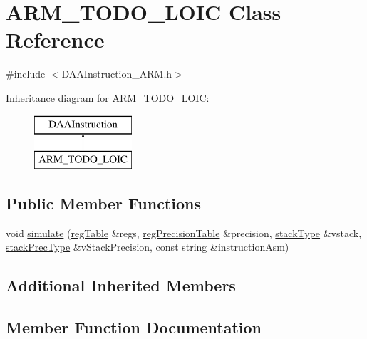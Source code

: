 \hypertarget{classARM__TODO__LOIC}{}\section{A\+R\+M\+\_\+\+T\+O\+D\+O\+\_\+\+L\+O\+IC Class Reference}
\label{classARM__TODO__LOIC}


{\ttfamily \#include $<$D\+A\+A\+Instruction\+\_\+\+A\+R\+M.\+h$>$}

Inheritance diagram for A\+R\+M\+\_\+\+T\+O\+D\+O\+\_\+\+L\+O\+IC\+:\begin{figure}[H]
\begin{center}
\leavevmode
\includegraphics[height=2.000000cm]{classARM__TODO__LOIC}
\end{center}
\end{figure}
\subsection*{Public Member Functions}
\begin{DoxyCompactItemize}
\item 
void \hyperlink{classARM__TODO__LOIC_af547e3b446a38bb9bc52c6063a2e5f4f}{simulate} (\hyperlink{DAAInstruction_8h_af0fae93a861de9cf37988d5673cac523}{reg\+Table} \&regs, \hyperlink{DAAInstruction_8h_a0e8cae02815a5f8adc750122d790b455}{reg\+Precision\+Table} \&precision, \hyperlink{DAAInstruction_8h_a1b0e70ac1a04f06c8132055ed01f589f}{stack\+Type} \&vstack, \hyperlink{DAAInstruction_8h_ac5cb793e9dac3fa9693da78b7e29ab30}{stack\+Prec\+Type} \&v\+Stack\+Precision, const string \&instruction\+Asm)
\end{DoxyCompactItemize}
\subsection*{Additional Inherited Members}


\subsection{Member Function Documentation}
\mbox{\label{classARM__TODO__LOIC_af547e3b446a38bb9bc52c6063a2e5f4f}} 
